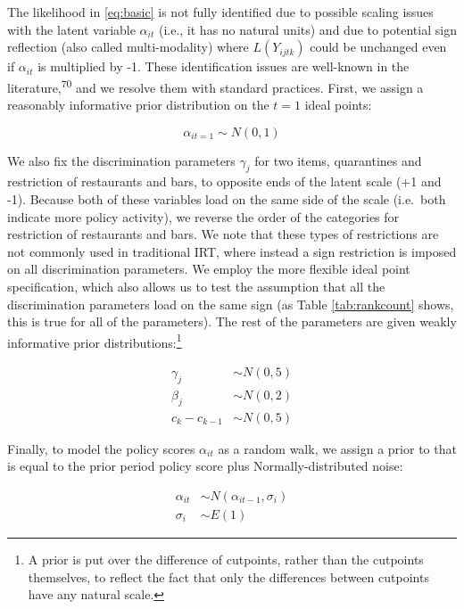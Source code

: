 \documentclass[
]{article}
\begin{document}
The likelihood in \eqref{eq:basic} is not fully identified due to possible scaling issues with the latent variable \(\alpha_{it}\) (i.e., it has no natural units) and due to potential sign reflection (also called multi-modality) where \(L(Y_{ijtk})\) could be unchanged even if \(\alpha_{it}\) is multiplied by -1. These identification issues are well-known in the literature,\textsuperscript{70} and we resolve them with standard practices. First, we assign a reasonably informative prior distribution on the \(t=1\) ideal points:

\begin{equation}
\alpha_{it=1} \sim N(0,1)
\label{eq:id1}
\end{equation}

We also fix the discrimination parameters \(\gamma_j\) for two items, quarantines and restriction of restaurants and bars, to opposite ends of the latent scale (+1 and -1). Because both of these variables load on the same side of the scale (i.e.~both indicate more policy activity), we reverse the order of the categories for restriction of restaurants and bars. We note that these types of restrictions are not commonly used in traditional IRT, where instead a sign restriction is imposed on all discrimination parameters. We employ the more flexible ideal point specification, which also allows us to test the assumption that all the discrimination parameters load on the same sign (as Table \ref{tab:rankcount} shows, this is true for all of the parameters). The rest of the parameters are given weakly informative prior distributions:\footnote{A prior is put over the difference of cutpoints, rather than the cutpoints themselves, to reflect the fact that only the differences between cutpoints have any natural scale.}

\begin{align}
\gamma_j &\sim N(0,5)\\
\beta_j &\sim N(0,2)\\
c_k - c_{k-1} &\sim N(0,5)
\label{eq:id2}
\end{align}

Finally, to model the policy scores \(\alpha_{it}\) as a random walk, we assign a prior to that is equal to the prior period policy score plus Normally-distributed noise:

\begin{align}
\alpha_{it} &\sim N(\alpha_{it-1},\sigma_i)\\
\sigma_i &\sim E(1)
\label{eq:rwc}
\end{align}
\end{document}
